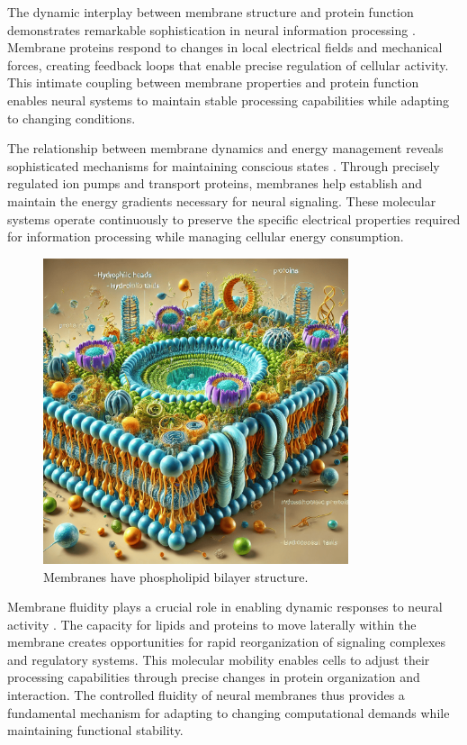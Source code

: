 The dynamic interplay between membrane structure and protein function demonstrates remarkable sophistication in neural information processing \cite{Kusumi2012}. Membrane proteins respond to changes in local electrical fields and mechanical forces, creating feedback loops that enable precise regulation of cellular activity. This intimate coupling between membrane properties and protein function enables neural systems to maintain stable processing capabilities while adapting to changing conditions.

The relationship between membrane dynamics and energy management reveals sophisticated mechanisms for maintaining conscious states \cite{Yang2019}. Through precisely regulated ion pumps and transport proteins, membranes help establish and maintain the energy gradients necessary for neural signaling. These molecular systems operate continuously to preserve the specific electrical properties required for information processing while managing cellular energy consumption.

\begin{figure}[h]
    \centering
    \includegraphics[width=0.8\textwidth]{images/membrane.png}

    \caption{Membranes have phospholipid bilayer structure.}
\end{figure}

Membrane fluidity plays a crucial role in enabling dynamic responses to neural activity \cite{Lingwood2010}. The capacity for lipids and proteins to move laterally within the membrane creates opportunities for rapid reorganization of signaling complexes and regulatory systems. This molecular mobility enables cells to adjust their processing capabilities through precise changes in protein organization and interaction. The controlled fluidity of neural membranes thus provides a fundamental mechanism for adapting to changing computational demands while maintaining functional stability.

